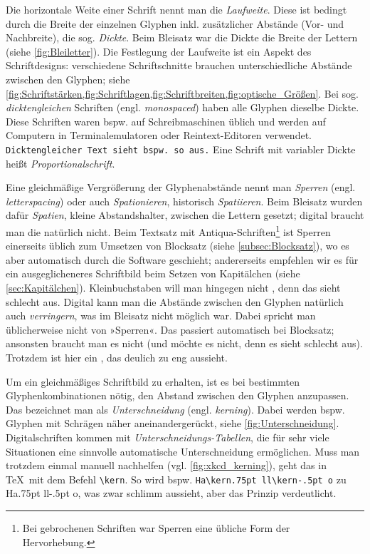 Die horizontale Weite einer Schrift nennt man die \emph{Laufweite}.
Diese ist bedingt durch die Breite der einzelnen Glyphen
inkl. zusätzlicher Abstände (Vor- und Nachbreite), die
sog. \emph{Dickte}.  Beim Bleisatz war die Dickte die Breite der
Lettern (siehe \cref{fig:Bleiletter}).  Die Festlegung der Laufweite
ist ein Aspekt des Schriftdesigns: verschiedene Schriftschnitte
brauchen unterschiedliche Abstände zwischen den Glyphen; siehe
\cref{fig:Schriftstärken,fig:Schriftlagen,fig:Schriftbreiten,fig:optische_Größen}.
Bei sog. \emph{dicktengleichen} Schriften
(engl. \emph{\foreignlanguage{british}{monospaced}}) haben alle
Glyphen dieselbe Dickte.  Diese Schriften waren bspw. auf
Schreibmaschinen üblich und werden auf Computern in Terminalemulatoren
oder Reintext-Editoren verwendet.  \texttt{Dicktengleicher Text sieht
  bspw. so aus.}  Eine Schrift mit variabler Dickte heißt
\emph{Proportionalschrift}.

Eine gleichmäßige Vergrößerung der Glyphenabstände nennt man
\emph{Sperren} (engl. \emph{\foreignlanguage{british}{letterspacing}})
oder auch \emph{Spationieren}, historisch \emph{Spatiieren}.  Beim
Bleisatz wurden dafür \emph{Spatien}, kleine Abstandshalter, zwischen
die Lettern gesetzt; digital braucht man die natürlich nicht.  Beim
Textsatz mit Antiqua-Schriften\footnote{Bei gebrochenen Schriften war
  Sperren eine übliche Form der Hervorhebung.} ist Sperren einerseits
üblich zum Umsetzen von Blocksatz (siehe \cref{subsec:Blocksatz}), wo
es aber automatisch durch die Software geschieht; andererseits
empfehlen wir es für ein ausgeglicheneres Schriftbild beim Setzen von
Kapitälchen (siehe \cref{sec:Kapitälchen}).  Kleinbuchstaben will man
hingegen nicht , denn das sieht schlecht aus.
Digital kann man die Abstände zwischen den Glyphen natürlich auch
\emph{verringern}, was im Bleisatz nicht möglich war.  Dabei spricht
man üblicherweise nicht von »Sperren«.  Das passiert automatisch bei
Blocksatz; ansonsten braucht man es nicht (und möchte es nicht, denn
es sieht schlecht aus).  Trotzdem ist hier ein ,
das deulich zu eng aussieht.

Um ein gleichmäßiges Schriftbild zu erhalten, ist es bei bestimmten
Glyphenkombinationen nötig, den Abstand zwischen den Glyphen
anzupassen.  Das bezeichnet man als \emph{Unterschneidung}
(engl. \emph{\foreignlanguage{british}{kerning}}).  Dabei werden
bspw. Glyphen mit Schrägen näher aneinandergerückt, siehe
\cref{fig:Unterschneidung}.  Digitalschriften kommen mit
\emph{Un\-ter\-schnei\-dungs-Tabellen}, die für sehr viele Situationen
eine sinnvolle automatische Unterschneidung ermöglichen.  Muss man
trotzdem einmal manuell nachhelfen (vgl. \cref{fig:xkcd_kerning}),
geht das in \TeX\ mit dem Befehl \verb!\kern!.  So wird
bspw. \verb!Ha\kern.75pt ll\kern-.5pt o! zu Ha\kern.75pt ll\kern-.5pt
o, was zwar schlimm aussieht, aber das Prinzip verdeutlicht.

